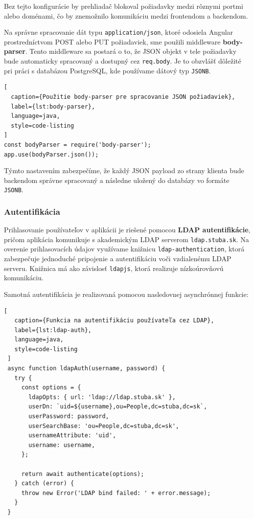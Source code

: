 Bez tejto konfigurácie by prehliadač blokoval požiadavky medzi rôznymi portmi alebo doménami, čo by znemožnilo komunikáciu medzi frontendom a backendom.

\bigskip
Na správne spracovanie dát typu \texttt{application/json}, ktoré odosiela Angular prostredníctvom POST alebo PUT požiadaviek, sme použili middleware \textbf{body-parser}. Tento middleware sa postará o to, že JSON objekt v tele požiadavky bude automaticky spracovaný a dostupný cez \texttt{req.body}. Je to obzvlášť dôležité pri práci s databázou PostgreSQL, kde používame dátový typ \texttt{JSONB}.

\begin{lstlisting}[
  caption={Použitie body-parser pre spracovanie JSON požiadaviek},
  label={lst:body-parser},
  language=java,
  style=code-listing
]
const bodyParser = require('body-parser');
app.use(bodyParser.json());
\end{lstlisting}

Týmto nastavením zabezpečíme, že každý JSON payload zo strany klienta bude backendom správne spracovaný a následne uložený do databázy vo formáte \texttt{JSONB}.


 \subsubsection{Autentifikácia}

 Prihlasovanie používateľov v aplikácii je riešené pomocou \textbf{LDAP autentifikácie}, pričom aplikácia komunikuje s akademickým LDAP serverom \texttt{ldap.stuba.sk}. Na overenie prihlasovacích údajov využívame knižnicu \texttt{ldap-authentication}, ktorá zabezpečuje jednoduché pripojenie a autentifikáciu voči vzdialenému LDAP serveru. Knižnica má ako závislosť \texttt{ldapjs}, ktorá realizuje nízkoúrovňovú komunikáciu.
 
 Samotná autentifikácia je realizovaná pomocou nasledovnej asynchrónnej funkcie:
 
 \begin{lstlisting}[
   caption={Funkcia na autentifikáciu používateľa cez LDAP},
   label={lst:ldap-auth},
   language=java,
   style=code-listing
 ]
 async function ldapAuth(username, password) {
   try {
     const options = {
       ldapOpts: { url: 'ldap://ldap.stuba.sk' },
       userDn: `uid=${username},ou=People,dc=stuba,dc=sk`,
       userPassword: password,
       userSearchBase: 'ou=People,dc=stuba,dc=sk',
       usernameAttribute: 'uid',
       username: username,
     };
 
     return await authenticate(options);
   } catch (error) {
     throw new Error('LDAP bind failed: ' + error.message);
   }
 }
 \end{lstlisting}
 
